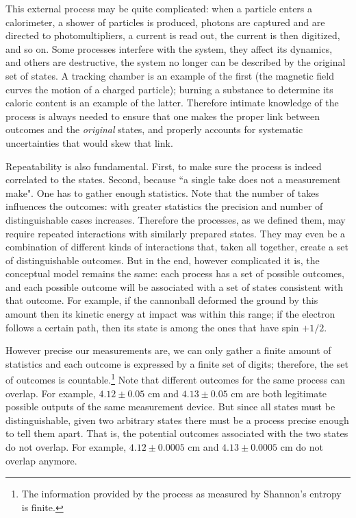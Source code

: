 \documentclass[aps,pra,10pt,twocolumn,floatfix,nofootinbib]{revtex4-1}
\numberwithin{equation}{section}
\theoremstyle{definition}
\begin{document}
This external process may be quite complicated: when a particle enters a calorimeter, a shower of particles is produced, photons are captured and are directed to photomultipliers, a current is read out, the current is then digitized, and so on. Some processes interfere with the system, they affect its dynamics, and others are destructive, the system no longer can be described by the original set of states. A tracking chamber is an example of the first (the magnetic field curves the motion of a charged particle); burning a substance to determine its caloric content is an example of the latter. Therefore intimate knowledge of the process is always needed to ensure that one makes the proper link between outcomes and the \emph{original} states, and properly accounts for systematic uncertainties that would skew that link.

Repeatability is also fundamental. First, to make sure the process is indeed correlated to the states. Second, because ``a single take does not a measurement make". One has to gather enough statistics. Note that the number of takes influences the outcomes: with greater statistics the precision and number of distinguishable cases increases. Therefore the processes, as we defined them, may require repeated interactions with similarly prepared states. They may even be a combination of different kinds of interactions that, taken all together, create a set of distinguishable outcomes. But in the end, however complicated it is, the conceptual model remains the same: each process has a set of possible outcomes, and each possible outcome will be associated with a set of states consistent with that outcome. For example, if the cannonball deformed the ground by this amount then its kinetic energy at impact was within this range; if the electron follows a certain path, then its state is among the ones that have spin $+1/2$.

However precise our measurements are, we can only gather a finite amount of statistics and each outcome is expressed by a finite set of digits; therefore, the set of outcomes is countable.\footnote{The information provided by the process as measured by Shannon's entropy is finite.} Note that different outcomes for the same process can overlap. For example, $4.12 \pm 0.05$ cm and $4.13 \pm 0.05$ cm are both legitimate possible outputs of the same measurement device. But since all states must be distinguishable, given two arbitrary states there must be a process precise enough to tell them apart. That is, the potential outcomes associated with the two states do not overlap. For example, $4.12 \pm 0.0005$ cm and $4.13 \pm 0.0005$ cm do not overlap anymore.
\end{document}
